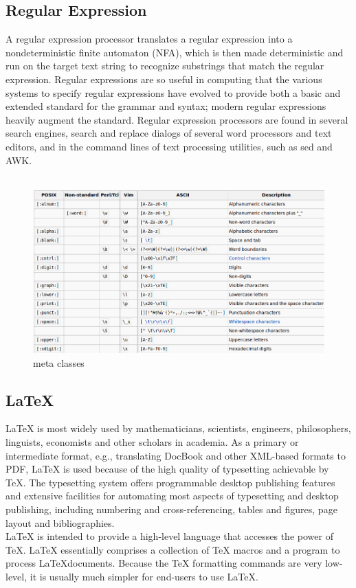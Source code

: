 \subsection{Regular Expression}
A regular expression processor translates a regular expression into a nondeterministic finite automaton (NFA), which is then made deterministic and run on the target text string to recognize substrings that match the regular expression. Regular expressions are so useful in computing that the various systems to specify regular expressions have evolved to provide both a basic and extended standard for the grammar and syntax; modern regular expressions heavily augment the standard. Regular expression processors are found in several search engines, search and replace dialogs of several word processors and text editors, and in the command lines of text processing utilities, such as sed and AWK.\\\\
\begin{figure} [h!]
\centering
\includegraphics[scale=0.3]{images/regx.png}
\caption{meta classes}
\end{figure}

\subsection{\LaTeX{}}
\LaTeX{} is most widely used by mathematicians, scientists, 
engineers, philosophers, linguists, economists and other scholars in 
academia. As a primary or intermediate format, e.g., translating DocBook 
and other XML-based formats to PDF, \LaTeX{} is used because of the 
high quality of typesetting achievable by \TeX. The typesetting system 
offers programmable desktop publishing features and extensive facilities 
for automating most aspects of typesetting and desktop publishing, 
including numbering and cross-referencing, tables and figures, 
page layout and bibliographies.\\
\LaTeX{} is intended to provide a high-level language that
accesses the power of \TeX. \LaTeX{} essentially comprises a
collection of \TeX{} macros and a program to process \LaTeX documents. 
Because the \TeX{} formatting commands are very low-level, it is usually 
much simpler for end-users to use \LaTeX{}.

